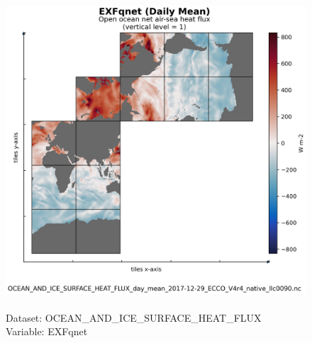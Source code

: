 \begin{figure}[H]
\centering
\includegraphics[scale=0.5]{../images/plots/native_plots/Ocean_and_Sea-Ice_Surface_Heat_Fluxes/EXFqnet.png}
\caption{\\Dataset: OCEAN\_AND\_ICE\_SURFACE\_HEAT\_FLUX\\Variable: EXFqnet}
\label{tab:table-OCEAN_AND_ICE_SURFACE_HEAT_FLUX_EXFqnet-Plot}
\end{figure}
\pagebreak
